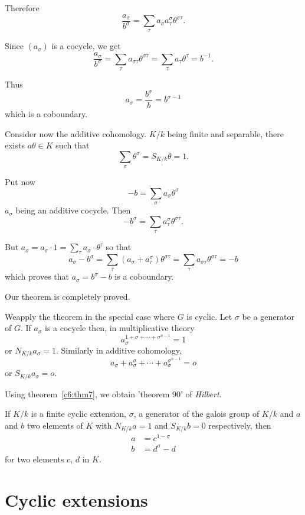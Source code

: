 Therefore
$$
\frac{a_\sigma}{b^\sigma} = \sum_\tau a_\sigma a^\sigma_\tau
\theta^{\sigma \tau}. 
$$

Since $(a_\sigma)$ is a cocycle, we get
$$
\frac{a_\sigma}{b^\sigma}=\sum_\tau a_{\sigma \tau }\theta^{\sigma
  \tau}=\sum_\tau a_\tau \theta^\tau = b^{-1}. 
$$

Thus
$$
a_\sigma = \frac{b^\sigma}{b} = b^{\sigma-1}
$$
which is a coboundary.

Consider now the additive cohomology. $K/k$ being finite and
separable, there exists $a \theta \in K$ such that 
$$
\sum_\sigma \theta^\sigma = S_{K/k}\theta =1.
$$

Put now
$$
-b=\sum_\sigma a_\sigma \theta^\sigma
$$
$a_\sigma$ being an additive cocycle. Then
$$
-b^\sigma =\sum_\tau  a^\sigma_\tau \theta^{\sigma \tau}.
$$

But $a_\sigma = a_\sigma \cdot 1 =\sum_\tau a_\sigma \cdot
\theta^\tau$ so that 
$$
a_\sigma -b^\sigma=\sum_\tau (a_\sigma+a^\sigma_\tau) \theta^{\sigma
  \tau }=\sum_\tau a_{\sigma \tau}\theta^{\sigma \tau }= -b 
$$
which proves that $a_\sigma = b^\sigma -b$ is a coboundary.

Our theorem is completely proved.

We\pageoriginale apply the theorem in the special case where $G$ is
cyclic. Let $\sigma$ be a generator of $G$. If $a_\sigma$ is a cocycle
then, in multiplicative theory  
$$
a^{1+\sigma + \cdots +\sigma^{n-1}}_\sigma =1
$$
or $N_{K/k} a_\sigma =1$. Similarly in additive cohomology,
$$
 a_\sigma + a^\sigma_\sigma + \cdots +a^{\sigma^{n-1}}_\sigma =o
$$
or $S_{K/k} a_\sigma =o$.

Using theorem~\ref{c6:thm7}, we obtain 'theorem 90' of
\textit{Hilbert}.  

\begin{thm}\label{c6:thm8} %
If $K/k$ is a finite cyclic extension, $\sigma$, a generator of
  the galois group of $K/k$ and $a$ and $b$ two elements of $K$ with
  $N_{K/k}a=1$ and $S_{K/k}b=0$ respectively, then 
\begin{align*}
a & = c^{1-\sigma}\\
b & = d^{\sigma}-d
\end{align*}
for two elements $c$, $d$ in $K$.
\end{thm}


\section{Cyclic extensions}\label{c6:s4}%

